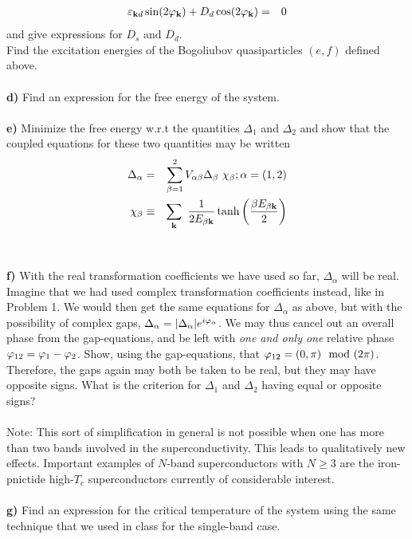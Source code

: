 \begin{problem}
\begin{eqnarray}
		\varepsilon_{{\bf k} d}  \sin(2 \varphi_{\bf k}) +    D_d \cos(2 \varphi_{\bf k})  & = & 0 \nonumber 
	\end{eqnarray}
	and give expressions for $D_s$ and $D_d$. \\
	Find the excitation energies of the Bogoliubov quasiparticles $(e,f)$ defined above.
	\ \\
	\ \\
	{\bf d)} Find an expression for the free energy of the system.
	\ \\
	\ \\
	{\bf e)} Minimize the free energy w.r.t the quantities $\Delta_1$ and $\Delta_2$ and show that the coupled equations for these two quantities may be written
	\begin{eqnarray}
		\Delta_{\alpha} & = & \sum_{\beta=1}^2 V_{\alpha \beta} \Delta_{\beta} ~ \chi_{\beta};  \alpha = (1,2)  \nonumber \\
		\chi_{\beta} & \equiv & \sum_{\bf k} ~ \frac{1}{2 E_{\beta \bf k} } \tanh \left( \frac{\beta E_{\beta \bf k}}{2} \right) \nonumber
	\end{eqnarray}
	\ \\
	\ \\
	{\bf f)} With the real transformation coefficients we have used so far, $\Delta_\alpha$ will be real. Imagine that we had used complex transformation coefficients instead, like in Problem 1. We would then get the same equations for $\Delta_{\alpha}$ as above, but  with the possibility of complex gaps, $\Delta_{\alpha} = |\Delta_{\alpha}| e^{i \varphi_\alpha}$. We may thus cancel out an overall phase from the gap-equations, and be left with {\it one and only one} relative phase $\varphi_{12}= \varphi_1-\varphi_2$. Show, using the gap-equations, that $\varphi_{12} = (0,\pi) \mod(2 \pi)$. Therefore, the gaps again may both be taken to be real, but they may have opposite signs. What is the criterion for $\Delta_1$ and $\Delta_2$ having equal or opposite signs?
	\ \\
	\ \\
	Note: This sort of simplification in general is not possible when one has more than two bands involved in the superconductivity. This leads to qualitatively new effects. Important examples of $N$-band superconductors with $N \geq 3$ are the iron-pnictide high-$T_c$ superconductors currently of considerable interest.  
	\ \\
	\ \\
	{\bf g)} Find an expression for the critical temperature of the system using the same technique that we used in class for the single-band case.  
\end{problem}

